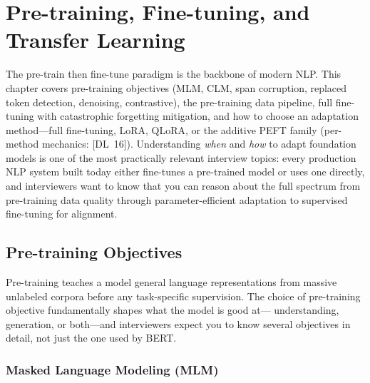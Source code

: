 
\chapter{Pre-training, Fine-tuning, and Transfer Learning}
\label{chap:pretraining_finetuning}

\begin{tldr}
The pre-train then fine-tune paradigm is the backbone of modern NLP.  This chapter
covers pre-training objectives (MLM, CLM, span corruption, replaced token detection,
denoising, contrastive), the pre-training data pipeline, full fine-tuning with
catastrophic forgetting mitigation, and how to choose an adaptation method---full
fine-tuning, LoRA, QLoRA, or the additive PEFT family (per-method mechanics: [DL~16]).
Understanding \emph{when} and \emph{how} to adapt foundation models is one of the
most practically relevant interview topics: every production NLP system built today
either fine-tunes a pre-trained model or uses one directly, and interviewers want to
know that you can reason about the full spectrum from pre-training data quality
through parameter-efficient adaptation to supervised fine-tuning for alignment.
\end{tldr}

\bigskip

\section{Pre-training Objectives}
\label{sec:pretraining-objectives}

Pre-training teaches a model general language representations from massive
unlabeled corpora before any task-specific supervision.  The choice of
pre-training objective fundamentally shapes what the model is good at---
understanding, generation, or both---and interviewers expect you to know
several objectives in detail, not just the one used by BERT.

\subsection{Masked Language Modeling (MLM)}

